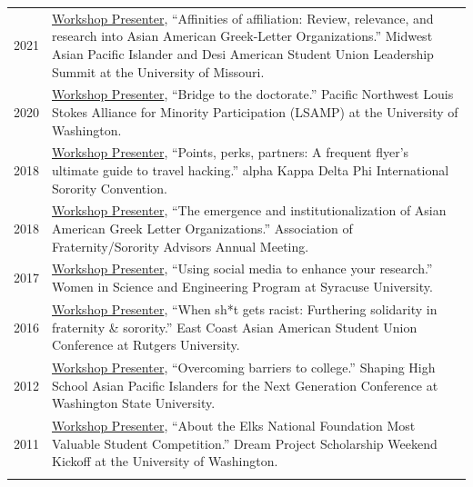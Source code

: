 \documentclass[12pt]{article}
\begin{document}
{\begin{longtable}{R{0.75in}p{5.0in}}
\footnotesize{2021} &
\href{https://web.archive.org/web/20210315001355/https://www.maasuls2021.org/workshops}{Workshop Presenter}, ``Affinities of affiliation: Review, relevance, and research into Asian American Greek-Letter Organizations.'' Midwest Asian Pacific Islander and Desi American Student Union Leadership Summit at the University of Missouri.\\

\footnotesize{2020} & \href{https://uwaablog.wordpress.com/wp-content/uploads/2018/05/uw-lsamp-one-pager-4.pdf}{Workshop Presenter}, ``Bridge to the doctorate.'' Pacific Northwest Louis Stokes Alliance for Minority Participation (LSAMP) at the University of Washington.\\

\footnotesize{2018} & \href{https://web.archive.org/web/20190722125246/http://www.akdphi.org/workshops}{Workshop Presenter}, ``Points, perks, partners: A frequent flyer's ultimate guide to travel hacking.'' alpha Kappa Delta Phi International Sorority Convention.\\

\footnotesize{2018} & \href{https://web.archive.org/web/20240910070425/https://issuu.com/afa1976/docs/afaam-2018-programbook-final-noblee}{Workshop Presenter}, ``The emergence and institutionalization of Asian American Greek Letter Organizations.'' Association of Fraternity/Sorority Advisors Annual Meeting.\\

\footnotesize{2017} & \href{https://suwise.syr.edu/}{Workshop Presenter}, ``Using social media to enhance your research.'' Women in Science and Engineering Program at Syracuse University.\\

\footnotesize{2016} & \href{https://web.archive.org/web/20160302043700/http://www.ecaasu2016.org/}{Workshop Presenter}, ``When sh*t gets racist: Furthering solidarity in fraternity \& sorority.'' East Coast Asian American Student Union Conference at Rutgers University.\\

\footnotesize{2012} & \href{https://shaping.wsu.edu/}{Workshop Presenter}, ``Overcoming barriers to college.'' Shaping High School Asian Pacific Islanders for the Next Generation Conference at Washington State University.\\

\footnotesize{2011} & \href{https://www.washington.edu/dreamproject/}{Workshop Presenter}, ``About the Elks National Foundation Most Valuable Student Competition.'' Dream Project Scholarship Weekend Kickoff at the University of Washington.\medskip \\ \pagebreak


\end{longtable}}
\end{document}
